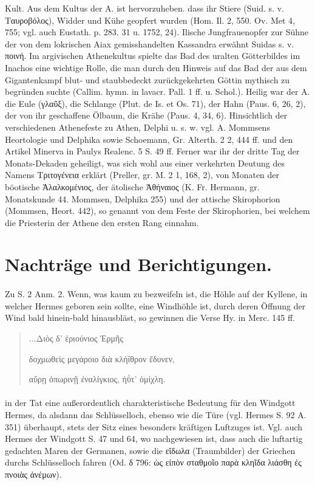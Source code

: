 \documentclass[a4paper, 11pt, oneside]{article}
\begin{document}
Kult. Aus dem Kultus der A. ist hervorzuheben. dass ihr Stiere (Suid. s. v. Ταυροβόλος), Widder und Kühe geopfert wurden (Hom. Il. 2, 550. Ov. Met 4, 755; vgl. auch Eustath. p. 283. 31 u. 1752, 24). Ilische Jungfrauenopfer zur Sühne der von dem lokrischen Aiax gemisshandelten Kassandra erwähnt Suidas s. v. ποινή. Im argivischen Athenekultus spielte das Bad des uralten Götterbildes im Inachos eine wichtige Rolle, die man durch den Hinweis auf das Bad der aus dem Gigantenkampf blut- und staubbedeckt zurückgekehrten Göttin mythisch zu begründen suchte (Callim. hymn. in lavacr. Pall. 1 ff. u. Schol.). Heilig war der A. die Eule (γλαῦξ), die Schlange (Plut. de Is. et Os. 71), der Hahn (Paus. 6, 26, 2), der von ihr geschaffene Ölbaum, die Krähe (Paus. 4, 34, 6). Hinsichtlich der verschiedenen Athenefeste zu Athen, Delphi u. s. w. vgl. A. Mommsens Heortologie und Delphika sowie Schoemann, Gr. Alterth. 2 2, 444 ff. und den Artikel Minerva in Paulys Realenc. 5 S. 49 ff. Ferner war ihr der dritte Tag der Monats-Dekaden geheiligt, was sich wohl aus einer verkehrten Deutung des Namens Τριτογένεια erklärt (Preller, gr. M. 2 1, 168, 2), von Monaten der böotische Ἀλαλκομένιος, der ätolische Ἀθήναιος (K. Fr. Hermann, gr. Monatskunde 44. Mommsen, Delphika 255) und der attische Skirophorion (Mommsen, Heort. 442), so genannt von dem Feste der Skirophorien, bei welchem die Priesterin der Athene den ersten Rang einnahm.
\clearpage
\section*{Nachträge und Berichtigungen.}
\paragraph{}
Zu S. 2 Anm. 2. Wenn, was kaum zu bezweifeln ist, die Höhle auf der Kyllene, in welcher Hermes geboren sein sollte, eine Windhöhle ist, durch deren Öffnung der Wind bald hinein-bald hinausbläst, so gewinnen die Verse Hy. in Merc. 145 ff.
\begin{quotation}
\hspace*{5mm}...Διὸς δ' ἐριούνιος Ἑρμῆς

δοχμωθεὶς μεγάροιο διὰ κλήΐθρον ἔδυνεν,

αὔρῃ ὀπωρινῇ ἐναλίγκιος, ἠΰτ' ὀμίχλη.
\end{quotation}
\paragraph{}
in der Tat eine außerordentlich charakteristische Bedeutung für den Windgott Hermes, da alsdann das Schlüsselloch, ebenso wie die Türe (vgl. Hermes S. 92 A. 351) überhaupt, stets der Sitz eines besonders kräftigen Luftzuges ist. Vgl. auch Hermes der Windgott S. 47 und 64, wo nachgewiesen ist, dass auch die luftartig gedachten Maren der Germanen, sowie die εἴδωλα (Traumbilder) der Griechen durchs Schlüsselloch fahren (Od. δ 796: ὡς εἰπὸν σταθμοῖο παρὰ κληῖδα λιάσθη ἐς πνοιὰς ἀνέμων).
\end{document}
